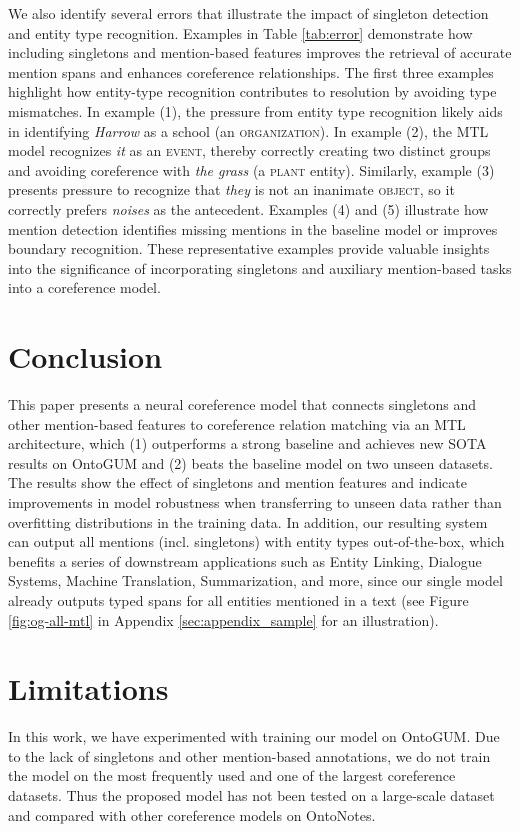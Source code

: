 \documentclass[11pt]{article}
\begin{document}
We also identify several errors that illustrate the impact of singleton detection and entity type recognition. Examples in Table \ref{tab:error} demonstrate how including singletons and mention-based features improves the retrieval of accurate mention spans and enhances coreference relationships. The first three examples highlight how entity-type recognition contributes to resolution by avoiding type mismatches. 
In example (1), the pressure from entity type recognition likely aids in identifying \textit{Harrow} as a school (an \textsc{organization}). 
In example (2), the MTL model recognizes \textit{it} as an \textsc{event}, thereby correctly creating two distinct groups and avoiding coreference with \textit{the grass} (a \textsc{plant} entity). Similarly, example (3) presents pressure to recognize that \textit{they} is not an inanimate \textsc{object}, so it correctly prefers \textit{noises} as the antecedent. Examples (4) and (5) illustrate how mention detection identifies missing mentions in the baseline model or improves boundary recognition. These representative examples provide valuable insights into the significance of incorporating singletons and auxiliary mention-based tasks into a coreference model.






\section{Conclusion} \label{sec:conclusion}
This paper presents a neural coreference model that connects singletons and other mention-based features to coreference relation matching via an MTL architecture, which (1) outperforms a strong baseline and achieves new SOTA results on OntoGUM and (2) beats the baseline model on two unseen datasets. The results show the effect of singletons and mention features and indicate improvements in model robustness when transferring to unseen data rather than overfitting distributions in the training data. In addition, our resulting system can output all mentions (incl. singletons) with entity types out-of-the-box, which benefits a series of downstream applications such as Entity Linking, Dialogue Systems, Machine Translation, Summarization, and more, since our single model already outputs typed spans for all entities mentioned in a text (see Figure \ref{fig:og-all-mtl} in Appendix \ref{sec:appendix_sample} for an illustration).

\section*{Limitations}
In this work, we have experimented with training our model on OntoGUM. Due to the lack of singletons and other mention-based annotations, we do not train the model on the most frequently used and one of the largest coreference datasets. Thus the proposed model has not been tested on a large-scale dataset and compared with other coreference models on OntoNotes.
\end{document}
